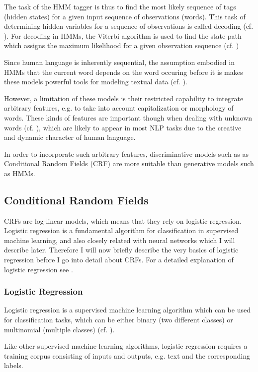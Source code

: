 The task of the HMM tagger is thus to find the most likely sequence of tags (hidden states) for a given input sequence of observations (words).  This task of determining hidden variables for a sequence of observations is called decoding (cf. \cite[11]{jurafsky_2021_8}). For decoding in HMMs, the Viterbi algorithm is used to find the state path which assigns the maximum likelihood for a given observation sequence (cf. \cite[12]{jurafsky_2021_8})

Since human language is inherently sequential, the assumption embodied in HMMs that the current word depends on the word occuring before it is makes these models powerful tools for modeling textual data (cf. \cite[21-22]{vajjala_practical_2020}).
 
However, a limitation of these models is their restricted capability to integrate arbitrary features, e.g. to take into account capitalization or morphology of words. These kinds of features are important though when dealing with unknown words (cf. \cite[15]{jurafsky_2021_8}), which are likely to appear in most NLP tasks due to the creative and dynamic character of human language. 

In order to incorporate such arbitrary features, discriminative models such as as Conditional Random Fields (CRF) are more suitable than generative models such as HMMs. 

\subsection{Conditional Random Fields}
CRFs are log-linear models, which means that they rely on logistic regression. Logistic regression is a fundamental algorithm for classification in supervised machine learning, and also closely related with neural networks which I will describe later. Therefore I will now briefly describe the very basics of logistic regression before I go into detail about CRFs. For a detailed explanation of logistic regression see \cite{jurafsky_2021_5}. 

\subsubsection{Logistic Regression}
Logistic regression is a supervised machine learning algorithm which can be used for classification tasks, which can be either binary (two different classes) or multinomial (multiple classes) (cf. \cite[1]{jurafsky_2021_5}). 

Like other supervised machine learning algorithms, logistic regression requires a training corpus consisting of inputs and outputs, e.g. text and the corresponding labels.

